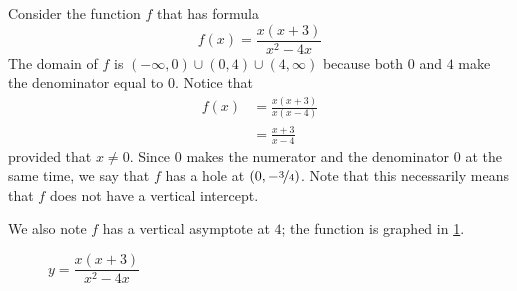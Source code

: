 \begin{pccexample}
Consider the function $f$ that has formula
\[
    f(x)=\frac{x(x+3)}{x^2-4x}
\]
The domain of $f$ is $(-\infty,0)\cup(0,4)\cup(4,\infty)$ because both $0$ and $4$ 
make the denominator equal to $0$. Notice that
\begin{align*}
    f(x)&= \frac{x(x+3)}{x(x-4)}   \\
        &= \frac{x+3}{x-4}
\end{align*}
provided that $x\ne 0$. Since $0$ makes the numerator 
and the denominator 0 at the same time, we say that $f$ has a hole at $(0,-\nicefrac{3}{4})$. 
Note that this necessarily means that $f$ does not have a vertical intercept.

We also note $f$ has a vertical asymptote at $4$; the function is graphed in \cref{rat:fig:holeex}.
\begin{figure}[!htb]
        \centering
            \caption{$y=\dfrac{x(x+3)}{x^2-4x}$}
            \label{rat:fig:holeex}
\end{figure}
\end{pccexample}




